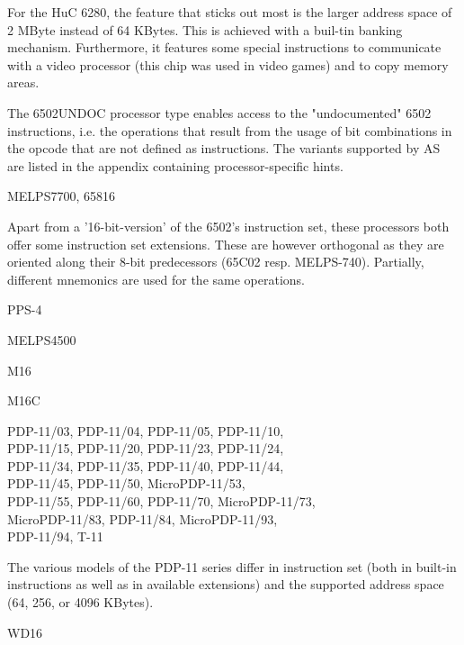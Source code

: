 \documentclass[12pt,twoside]{report}
\newcommand{\asname}{{AS}}
\begin{document}
For the HuC 6280, the feature that sticks out most is the larger
address space of 2 MByte instead of 64 KBytes.  This is achieved
with a buil-tin banking mechanism.  Furthermore, it features some
special instructions to communicate with a video processor (this
chip was used in video games) and to copy memory areas.

The 6502UNDOC processor type enables access to the "undocumented"
6502 instructions, i.e. the operations that result from the usage of bit
combinations in the opcode that are not defined as instructions.  The
variants supported by \asname{} are listed in the appendix containing processor-specific
hints.
\begin{cpulist}
   MELPS7700, 65816
\end{cpulist}
Apart from a '16-bit-version' of the 6502's instruction set, these
processors both offer some instruction set extensions.  These are
however orthogonal as they are oriented along their 8-bit
predecessors (65C02 resp. MELPS-740).  Partially, different
mnemonics are used for the same operations.
\begin{cpulist}
   PPS-4
\end{cpulist}
\begin{cpulist}
   MELPS4500
\end{cpulist}
\begin{cpulist}
   M16
\end{cpulist}
\begin{cpulist}
   M16C
\end{cpulist}
\begin{cpulist}
   PDP-11/03, PDP-11/04, PDP-11/05, PDP-11/10,\\
\> PDP-11/15, PDP-11/20, PDP-11/23, PDP-11/24,\\
\> PDP-11/34, PDP-11/35, PDP-11/40, PDP-11/44,\\
\> PDP-11/45, PDP-11/50, MicroPDP-11/53,\\
\> PDP-11/55, PDP-11/60, PDP-11/70, MicroPDP-11/73,\\
\> MicroPDP-11/83, PDP-11/84, MicroPDP-11/93,\\
\> PDP-11/94, T-11
\end{cpulist}
The various models of the PDP-11 series differ in instruction
set (both in built-in instructions as well as in available extensions)
and the supported address space (64, 256, or 4096 KBytes).
\begin{cpulist}
   WD16
\end{cpulist}
\end{document}
